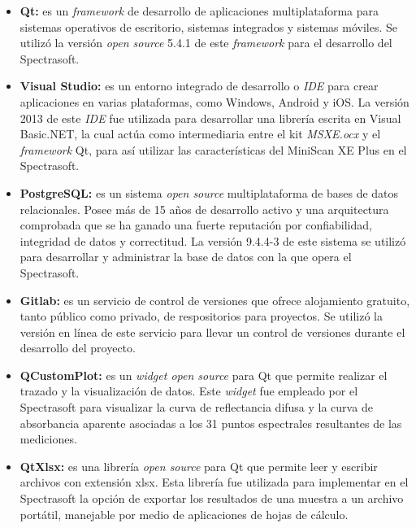 		\begin{itemize}
			
			\item \textbf{Qt:} es un \textit{framework} de desarrollo de aplicaciones multiplataforma para sistemas operativos de escritorio, sistemas integrados y sistemas m\'{o}viles. Se utiliz\'{o} la versi\'{o}n \textit{open source} 5.4.1 de este \textit{framework} para el desarrollo del Spectrasoft.
			
			\item \textbf{Visual Studio:} es un entorno integrado de desarrollo o \textit{IDE} para crear aplicaciones en varias plataformas, como Windows, Android y iOS. La versi\'{o}n 2013 de este \textit{IDE} fue utilizada para desarrollar una librer\'{i}a escrita en Visual Basic.NET, la cual act\'{u}a como intermediaria entre el kit \textit{MSXE.ocx} y el \textit{framework} Qt, para as\'{i} utilizar las caracter\'{i}sticas del MiniScan XE Plus en el Spectrasoft.
			
			\item \textbf{PostgreSQL:} es un sistema \textit{open source} multiplataforma de bases de datos relacionales. Posee m\'{a}s de 15 a\~{n}os de desarrollo activo y una arquitectura comprobada que se ha ganado una fuerte reputaci\'{o}n por confiabilidad, integridad de datos y correctitud. La versi\'{o}n 9.4.4-3 de este sistema se utiliz\'{o} para desarrollar y administrar la base de datos con la que opera el Spectrasoft.
			
			\item \textbf{Gitlab:} es un servicio de control de versiones que ofrece alojamiento gratuito, tanto p\'{u}blico como privado, de respositorios para proyectos. Se utiliz\'{o} la versi\'{o}n en l\'{i}nea de este servicio para llevar un control de versiones durante el desarrollo del proyecto.
			
			\item \textbf{QCustomPlot:} es un \textit{widget open source} para Qt que permite realizar el trazado y la visualizaci\'{o}n de datos. Este \textit{widget} fue empleado por el Spectrasoft para visualizar la curva de reflectancia difusa y la curva de absorbancia aparente asociadas a los 31 puntos espectrales resultantes de las mediciones.
			
			\item \textbf{QtXlsx:} es una librer\'{i}a \textit{open source} para Qt que permite leer y escribir archivos con extensi\'{o}n xlsx. Esta librer\'{i}a fue utilizada para implementar en el Spectrasoft la opci\'{o}n de exportar los resultados de una muestra a un archivo port\'{a}til, manejable por medio de aplicaciones de hojas de c\'{a}lculo.
		\end{itemize}
	

